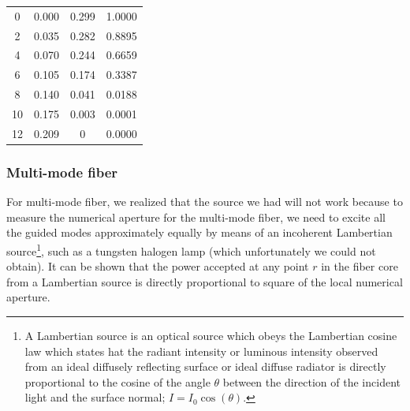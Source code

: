 \documentclass[%
 reprint,
nofootinbib,
 amsmath,amssymb,
 aps,
]{revtex4-2}
\begin{document}
\begin{table}[]
\begin{tabular}{@{}cccc@{}}
		0                                                 & 0.000                                              & 0.299                                           & 1.0000                                                     \\
		2                                                 & 0.035                                              & 0.282                                           & 0.8895                                                     \\
		4                                                 & 0.070                                              & 0.244                                           & 0.6659                                                     \\
		6                                                 & 0.105                                              & 0.174                                           & 0.3387                                                     \\
		8                                                 & 0.140                                              & 0.041                                           & 0.0188                                                     \\
		10                                                & 0.175                                              & 0.003                                           & 0.0001                                                     \\
		12                                                & 0.209                                              & 0                                               & 0.0000                                                     \\ \bottomrule
	\end{tabular}
\end{table}



\subsubsection{Multi-mode fiber}
For multi-mode fiber, we realized that the source we had will not work because to measure the numerical aperture for the multi-mode fiber, we need to excite all the guided modes approximately equally by means of an incoherent Lambertian source\footnote{A Lambertian source is an optical source which obeys the Lambertian cosine law which states hat the radiant intensity or luminous intensity observed from an ideal diffusely reflecting surface or ideal diffuse radiator is directly proportional to the cosine of the angle $ \theta $ between the direction of the incident light and the surface normal; $ I = I_0\cos(\theta) $.}, such as a tungsten halogen lamp (which unfortunately we could not obtain). It can be
shown that the power accepted at any point $ r $ in the fiber core from a Lambertian
source is directly proportional to square of the local numerical aperture.
\end{document}

